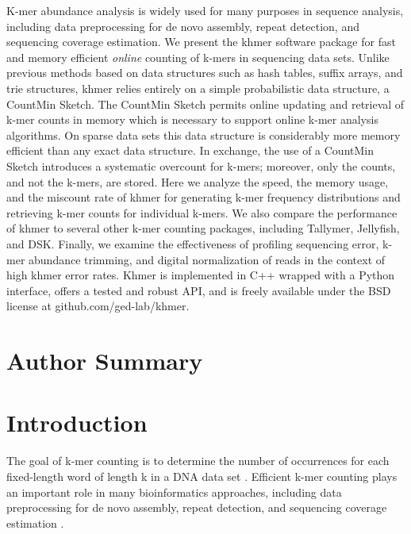 \documentclass[10pt]{article}
\begin{document}
K-mer abundance analysis is widely used for many purposes in sequence
analysis, including data preprocessing for de novo assembly, repeat
detection, and sequencing coverage estimation.
We present the khmer software package for fast and memory efficient
{\em online} counting of k-mers in sequencing
data sets. Unlike previous methods based on data structures such as
hash tables, suffix arrays, and trie structures, khmer relies entirely
on a simple probabilistic data structure, a CountMin Sketch.  The
CountMin Sketch permits online updating and retrieval of k-mer counts
in memory which is necessary to support online k-mer analysis algorithms.
On sparse data sets this data structure is considerably more memory
efficient than any exact data structure.  In exchange, the use of a
CountMin Sketch introduces a systematic overcount for k-mers;
moreover, only the counts, and not the k-mers, are stored.
Here we analyze the speed, the memory usage, and the miscount rate of khmer
for generating k-mer frequency distributions and retrieving k-mer
counts for individual k-mers.  We also compare the performance of
khmer to several other k-mer counting packages, including Tallymer,
Jellyfish, and DSK.  Finally, we examine the effectiveness of profiling 
sequencing error, k-mer abundance trimming, and
digital normalization of reads in the context of high khmer error
rates. Khmer is implemented in C++ wrapped with a Python
interface, offers a tested and robust API, and is freely available
under the BSD license at github.com/ged-lab/khmer.

\section*{Author Summary}

\section*{Introduction}

The goal of k-mer counting is to determine the number of occurrences
for each fixed-length word of length k in a DNA data set
\cite{Marcais2011}. Efficient k-mer counting plays an important role
in many bioinformatics approaches, including data preprocessing for de
novo assembly, repeat detection, and sequencing coverage estimation
\cite{Kurtz2008}.
\end{document}
